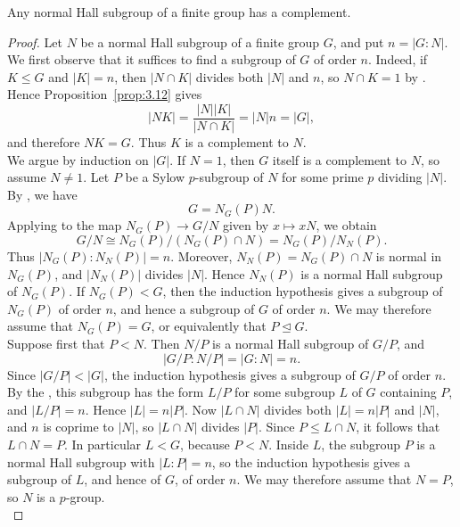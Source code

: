 \documentclass[../Odyssey_Project.tex]{subfiles}
\begin{document}
\begin{namedtheorem}
\label{thm:schur-zassenhaus}
Any normal Hall subgroup of a finite group has a complement.
\end{namedtheorem}
\begin{proof}
Let $N$ be a normal Hall subgroup of a finite group $G$, and put $n=\lvert G:N\rvert$. We first observe that it suffices to find a subgroup of $G$ of order $n$. Indeed, if $K\leq G$ and $\lvert K\rvert=n$, then $\lvert N\cap K\rvert$ divides both $\lvert N\rvert$ and $n$, so $N\cap K=1$ by . Hence Proposition~\ref{prop:3.12} gives
\[
    \lvert NK\rvert
    =\frac{\lvert N\rvert\lvert K\rvert}{\lvert N\cap K\rvert}
    =\lvert N\rvert n
    =\lvert G\rvert,
\]
and therefore $NK=G$. Thus $K$ is a complement to $N$.\\
We argue by induction on $\lvert G\rvert$. If $N=1$, then $G$ itself is a complement to $N$, so assume $N\neq 1$. Let $P$ be a Sylow $p$-subgroup of $N$ for some prime $p$ dividing $\lvert N\rvert$. By , we have
\[
    G=N_G(P)N.
\]
Applying  to the map $N_G(P)\to G/N$ given by $x\mapsto xN$, we obtain
\[
    G/N\cong N_G(P)/(N_G(P)\cap N)
    =N_G(P)/N_N(P).
\]
Thus $\lvert N_G(P):N_N(P)\rvert=n$. Moreover, $N_N(P)=N_G(P)\cap N$ is normal in $N_G(P)$, and $\lvert N_N(P)\rvert$ divides $\lvert N\rvert$. Hence $N_N(P)$ is a normal Hall subgroup of $N_G(P)$. If $N_G(P)<G$, then the induction hypothesis gives a subgroup of $N_G(P)$ of order $n$, and hence a subgroup of $G$ of order $n$. We may therefore assume that $N_G(P)=G$, or equivalently that $P\trianglelefteq G$.\\
Suppose first that $P<N$. Then $N/P$ is a normal Hall subgroup of $G/P$, and
\[
    \lvert G/P:N/P\rvert=\lvert G:N\rvert=n.
\]
Since $\lvert G/P\rvert<\lvert G\rvert$, the induction hypothesis gives a subgroup of $G/P$ of order $n$. By the , this subgroup has the form $L/P$ for some subgroup $L$ of $G$ containing $P$, and $\lvert L/P\rvert=n$. Hence $\lvert L\rvert=n\lvert P\rvert$. Now $\lvert L\cap N\rvert$ divides both $\lvert L\rvert=n\lvert P\rvert$ and $\lvert N\rvert$, and $n$ is coprime to $\lvert N\rvert$, so $\lvert L\cap N\rvert$ divides $\lvert P\rvert$. Since $P\leq L\cap N$, it follows that $L\cap N=P$. In particular $L<G$, because $P<N$. Inside $L$, the subgroup $P$ is a normal Hall subgroup with $\lvert L:P\rvert=n$, so the induction hypothesis gives a subgroup of $L$, and hence of $G$, of order $n$. We may therefore assume that $N=P$, so $N$ is a $p$-group.\\

\end{proof}
\end{document}
